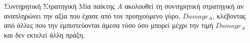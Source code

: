 {}
\begin{definitiongr}{Συντηρητική Στρατηγική}
  Μία παίκτης $A$ ακολουθεί τη συντηρητική στρατηγική αν αναπληρώνει την αξία που έχασε από τον προηγούμενο γύρο, $Damage_A$,
  κλέβοντας από άλλες που την εμπιστεύονται άμεσα τόσο όσο μπορεί μέχρι την τιμή $Damage_A$ και δεν εκτελεί άλλη πράξη.
\end{definitiongr}
